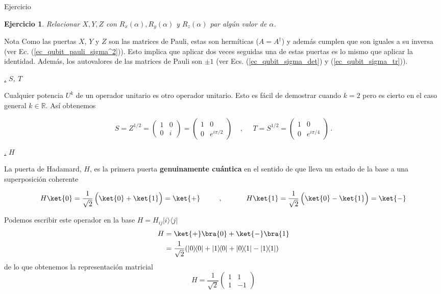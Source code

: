 \documentclass[a4paper,11pt]{book} %
\newtheorem{ejercicio_contador}{Ejercicio}
\newcommand{\Ejercicio}[1]{
		\begin{mybox_gray}{Ejercicio} 
			\begin{ejercicio_contador}
				 #1 
			\end{ejercicio_contador} 
		\end{mybox_gray}
	}
\numberwithin{equation}{chapter}
\def\lp{\left(}
\def\rp{\right)}
\newcommand{\ketbra}[2]{| #1\rangle \! \langle #2|}
\def\subsubiContadorIt{\par\addtocounter{subsubsection}{1}\underline{\it\thesubsubsection.}\hskip0.5cm \setcounter{subsubsubsectionIt}{0}}
\newcommand{\SubsubiIt}[1]{
		\subsubiContadorIt \textit{#1}
	}
\newcounter{subsubsubsectionIt}[subsubsection]
\begin{document}
\Ejercicio{Relacionar  $X,Y,Z$ con   $R_x(\alpha),R_y(\alpha)$ y $R_z(\alpha)$ par algún valor de $\alpha$.}
            
	\begin{mybox_blue}{Nota}
	Como las puertas $X$, $Y$ y $Z$ son las matrices de Pauli, estas son hermíticas ($A = A^\dagger$) y 
	además cumplen que son iguales a su inversa (ver Ec. (\ref{ec_qubit_pauli_sigma^2})). 
	Esto implica que aplicar dos veces seguidas una de estas puertas es lo mismo que aplicar la identidad. 
	Además, los autovalores de las matrices de Pauli son $\pm 1$ (ver Ecs. (\ref{ec_qubit_sigma_det}) y (\ref{ec_qubit_sigma_tr})).
	\end{mybox_blue}


            \SubsubiIt{$S$, $T$}

Cualquier potencia $U^k$ de un operador unitario es otro operador unitario. Esto es fácil de demostrar cuando $k=2$ pero es cierto en el caso general $k\in{\mathbb R}$. Así obtenemos

	\begin{equation}
	\boxed{S = Z^{1/2} =  \lp\begin{matrix}1&0\\0&i\end{matrix}\rp = \lp\begin{matrix}1&0\\0&e^{i\pi/2}\end{matrix} \rp}
	~~~~~,~~~~~~ 
	\boxed{T = S^{1/2} = \lp \begin{matrix} 1&0 \\ 0 & e^{i\pi/4} \end{matrix} \rp} \, .
	\end{equation}
            
            \SubsubiIt{$H$}
       
La puerta de Hadamard, $H$, es la primera puerta \textbf{genuinamente cuántica} en el sentido de que lleva un estado de la base a una superposición coherente

	\begin{equation}
	H \ket{0} = \frac{1}{\sqrt{2}}\left(\rule{0mm}{4mm}\ket{0} + \ket{1}\right) =\ket{+} 
	 ~~~~~~~~,~~~~~~~~~~
	H \ket{1} = \frac{1}{\sqrt{2}}\left(\rule{0mm}{4mm}\ket{0} - \ket{1}\right) =\ket{-} 
	\end{equation}

Podemos escribir este operador en la base $H = H_{ij}\ketbra{i}{j}$
	\begin{align*}
	H &=  \ket{+}\bra{0} +  \ket{-}\bra{1} \\
	  &= \frac{1}{\sqrt{2}}(\ketbra{0}{0} + \ketbra{1}{0} + \ketbra{0}{1} - \ketbra{1}{1})
	\end{align*}
de  lo que obtenemos la representación matricial
	\begin{equation} \label{ec_puertas_simples_H}
	\boxed{H   =  \frac{1}{\sqrt{2}} \lp \begin{matrix} 1 & 1 \\ 1 & -1 \end{matrix} \rp}
	\end{equation}
\end{document}
